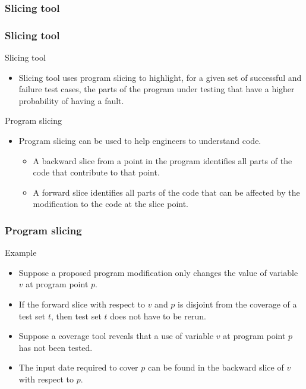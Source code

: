 \begin{frame}[c,parent={cmap:jabuti-software-testing},hasnext=true,hasprev=false]
\label{cmap:jabuti-slicing-tool}
\label{cmap:slicing-tool}
\frametitle{Slicing tool}

\end{frame}


\begin{frame}[parent={cmap:jabuti-slicing-tool},hasnext=true,hasprev=true]
\label{concept:program-slicing}
\label{concept:software-slicing}
\frametitle{Slicing tool}

\begin{block:concept}{Slicing tool}
\begin{itemize}
	\item Slicing tool uses program slicing to highlight, for a given set of
	successful and failure test cases, the parts of the program under testing
	that have a higher probability of having a fault.
\end{itemize}
\end{block:concept}

\begin{block:concept}{Program slicing}
\begin{itemize}
	\item Program slicing can be used to help engineers to understand code.
	\begin{itemize}
		\item A backward slice from a point in the program identifies all parts
		of the code that contribute to that point.

		\item A forward slice identifies all parts of the code that can be
		affected by the modification to the code at the slice point.
	\end{itemize}
\end{itemize}
\end{block:concept}
\end{frame}


\begin{frame}[imacidie]
\frametitle{Program slicing}

\begin{block}{Example}
\begin{itemize}
	\item Suppose a proposed program modification only changes the value of
	variable $v$ at program point $p$.

	\item If the forward slice with respect to $v$ and $p$ is disjoint from the
	coverage of a test set $t$, then test set $t$ does not have to be rerun.

	\item Suppose a coverage tool reveals that a use of variable $v$ at program
	point $p$ has not been tested.

	\item The input date required to cover $p$ can be found in the backward
	slice of $v$ with respect to $p$.
\end{itemize}
\end{block}
\end{frame}



